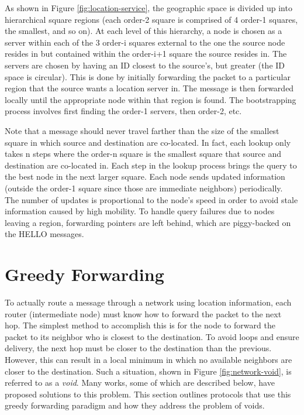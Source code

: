 \documentclass[conference]{IEEEtran}
\begin{document}
As shown in Figure \ref{fig:location-service}, the geographic space is divided up into hierarchical square regions (each order-2 square is comprised of 4 order-1 squares, the smallest, and so on).
At each level of this hierarchy, a node is chosen as a server within each of the 3 order-i squares external to the one the source node resides in but contained within the order-i+1 square the source resides in. 
The servers are chosen by having an ID closest to the source's, but greater (the ID space is circular).
This is done by initially forwarding the packet to a particular region that the source wants a location server in.
The message is then forwarded locally until the appropriate node within that region is found.
The bootstrapping process involves first finding the order-1 servers, then order-2, etc.

Note that a message should never travel farther than the size of the smallest square in which source and destination are co-located.
In fact, each lookup only takes n steps where the order-n square is the smallest square that source and destination are co-located in.   
Each step in the lookup process brings the query to the best node in the next larger square.          
Each node sends updated information (outside the order-1 square since those are immediate neighbors) periodically.
The number of updates is proportional to the node's speed in order to avoid stale information caused by high mobility.
To handle query failures due to nodes leaving a region, forwarding pointers are left behind, which are piggy-backed on the HELLO messages.



\section{Greedy Forwarding}

To actually route a message through a network using location information, each router (intermediate node) must know how to forward the packet to the next hop.
The simplest method to accomplish this is for the node to forward the packet to its neighbor who is closest to the destination.
To avoid loops and ensure delivery, the next hop must be closer to the destination than the previous.
However, this can result in a local minimum in which no available neighbors are closer to the destination.
Such a situation, shown in Figure \ref{fig:network-void}, is referred to as a \emph{void}.
Many works, some of which are described below, have proposed solutions to this problem.
This section outlines protocols that use this greedy forwarding paradigm and how they address the problem of voids.
\end{document}
